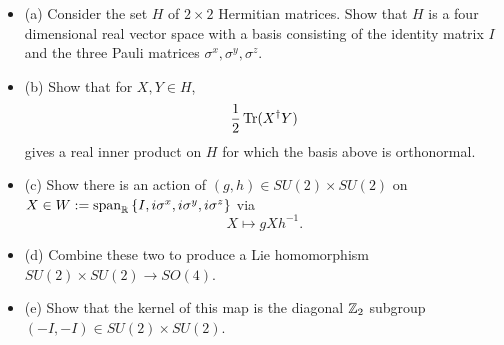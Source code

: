 \documentclass{article}
\begin{document}
\bigskip
\begin{prob}
    \begin{itemize}
        \item (a) Consider the set $H$ of $2 \times 2$ Hermitian matrices. Show that $H$ is a four dimensional real vector space with a basis consisting of the identity matrix $I$ and the three Pauli matrices $\sigma^x,\sigma^y,\sigma^z$.
        \item (b) Show that for $X,Y \in H$,
            \[ \frac{1}{2} \operatorname{Tr} (X^\dag Y) \]
            gives a real inner product on $H$ for which the basis above is orthonormal.
        \item (c) Show there is an action of $(g,h)\in SU(2) \times SU(2)$ on $X \in W := \operatorname{span}_{\mathbb{R}} \left\{ I, i\sigma^x, i\sigma^y, i\sigma^z \right\}$ via
            \[ X \mapsto gX h^{-1}. \]
        \item (d) Combine these two to produce a Lie homomorphism $SU(2) \times SU(2) \rightarrow SO(4)$.
        \item (e) Show that the kernel of this map is the diagonal $\mathbb{Z}_2$ subgroup $(-I,-I) \in SU(2) \times SU(2)$.
    \end{itemize}
\end{prob}
\end{document}
